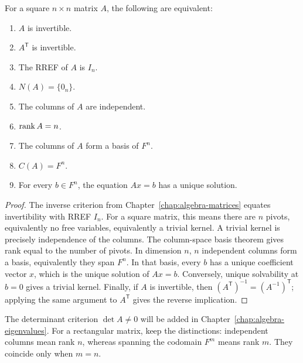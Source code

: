 \begin{theorem}
For a square $n\times n$ matrix $A$, the following are equivalent:
\begin{enumerate}
\item $A$ is invertible.
\item $A^{\mathsf T}$ is invertible.
\item The RREF of $A$ is $I_n$.
\item $N(A)=\{0_n\}$.
\item The columns of $A$ are independent.
\item $\operatorname{rank} A=n$.
\item The columns of $A$ form a basis of $F^n$.
\item $C(A)=F^n$.
\item For every $b\in F^n$, the equation $Ax=b$ has a unique solution.
\end{enumerate}
\end{theorem}
\begin{proof}
The inverse criterion from Chapter~\ref{chap:algebra-matrices} equates
invertibility with RREF $I_n$.
For a square matrix, this means there are $n$ pivots, equivalently no
free variables, equivalently a trivial kernel.
A trivial kernel is precisely independence of the columns.
The column-space basis theorem gives rank equal to the number of pivots.
In dimension $n$, $n$ independent columns form a basis, equivalently they
span $F^n$. In that basis, every $b$ has a unique coefficient vector
$x$, which is the unique solution of $Ax=b$.
Conversely, unique solvability at $b=0$ gives a trivial kernel.
Finally, if $A$ is invertible, then
$(A^{\mathsf T})^{-1}=(A^{-1})^{\mathsf T}$; applying the same argument
to $A^{\mathsf T}$ gives the reverse implication.
\end{proof}

The determinant criterion $\det A\ne0$ will be added in
Chapter~\ref{chap:algebra-eigenvalues}.
For a rectangular matrix, keep the distinctions:
independent columns mean rank $n$, whereas spanning the codomain $F^m$
means rank $m$. They coincide only when $m=n$.
